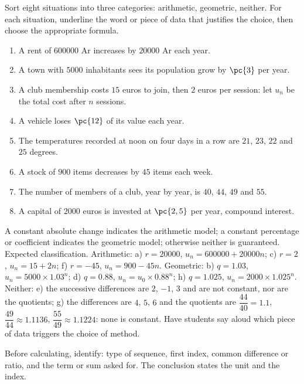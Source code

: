 \begin{activity}
Sort eight situations into three categories: arithmetic, geometric, neither. For each situation, underline the word or piece of data that justifies the choice, then choose the appropriate formula.
\begin{enumerate}[label=\alph*)]
\item A rent of $\num{600000}$ Ar increases by $\num{20000}$ Ar each year.
\item A town with $\num{5000}$ inhabitants sees its population grow by $\pc{3}$ per year.
\item A club membership costs $15$ euros to join, then $2$ euros per session: let $u_n$ be the total cost after $n$ sessions.
\item A vehicle loses $\pc{12}$ of its value each year.
\item The temperatures recorded at noon on four days in a row are $21$, $23$, $22$ and $25$ degrees.
\item A stock of $900$ items decreases by $45$ items each week.
\item The number of members of a club, year by year, is $40$, $44$, $49$ and $55$.
\item A capital of $\num{2000}$ euros is invested at $\pc{2,5}$ per year, compound interest.
\end{enumerate}

\end{activity}
\begin{solution}A constant absolute change indicates the arithmetic model; a constant percentage or coefficient indicates the geometric model; otherwise neither is guaranteed. Expected classification. Arithmetic: a) $r=\num{20000}$, $u_n=\num{600000}+\num{20000}n$; c) $r=2$, $u_n=15+2n$; f) $r=-45$, $u_n=900-45n$. Geometric: b) $q=\num{1,03}$, $u_n=\num{5000}\times\num{1,03}^n$; d) $q=\num{0,88}$, $u_n=u_0\times\num{0,88}^n$; h) $q=\num{1,025}$, $u_n=\num{2000}\times\num{1,025}^n$. Neither: e) the successive differences are $2$, $-1$, $3$ and are not constant, nor are the quotients; g) the differences are $4$, $5$, $6$ and the quotients are $\dfrac{44}{40}=\num{1,1}$, $\dfrac{49}{44}\approx\num{1,1136}$, $\dfrac{55}{49}\approx\num{1,1224}$: none is constant. Have students say aloud which piece of data triggers the choice of method.\end{solution}

\begin{summary}Before calculating, identify: type of sequence, first index, common difference or ratio, and the term or sum asked for. The conclusion states the unit and the index.\end{summary}

